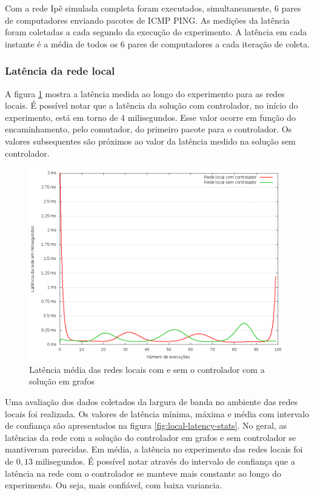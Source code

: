 Com a rede Ipê simulada completa foram executados, simultaneamente, 
6 pares de computadores enviando pacotes de ICMP PING. 
As medições da latência foram coletadas a cada segundo da execução do 
experimento. 
A latência em cada instante é a média de todos os 6 pares de computadores
a cada iteração de coleta.

\subsubsection{Latência da rede local}

A figura \ref{fig:local-latency} mostra a latência medida ao longo do 
experimento para as redes locais.
É possível notar que a latência da solução com controlador, no início do 
experimento, está em torno de 4 milisegundos.
Esse valor ocorre em função do encaminhamento, pelo comutador, do primeiro 
pacote para o controlador. 
Os valores subsequentes são próximos ao valor da latência medido na solução 
sem controlador.

\begin{figure}[!htb]
    \centering
    \label{fig:local-latency}
    \includegraphics[width=\linewidth]{img/local-latency}
    \caption{Latência média das redes locais com e sem o controlador com a 
    solução em grafos}
\end{figure}

Uma avaliação dos dados coletados da largura de banda no ambiente das 
redes locais foi realizada.
Os valores de latência mínima, máxima e média com intervalo de confiança 
são apresentados na figura \ref{fig:local-latency-stats}.
No geral, as latências da rede com a solução do controlador em grafos e 
sem controlador se mantiveram parecidas. 
Em média, a latência no experimento das redes locais foi de 
$0,13$ milisegundos.
É possível notar através do intervalo de confiança que a latência na rede 
com o controlador se manteve mais constante ao longo do experimento.
Ou seja, mais confiável, com baixa variancia.

